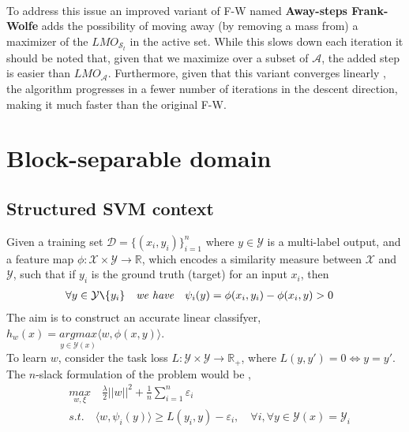 \documentclass{article}
\begin{document}
\\
To address this issue an improved variant of F-W named \textbf{Away-steps Frank-Wolfe} \cite{MarcotteGuelat85} adds the possibility of moving away (by removing a mass from) a maximizer of the $LMO_{\mathcal{S}_{t}}$ in the active set. While this slows down each iteration it should be noted that, given that we maximize over a subset of $\mathcal{A}$, the added step is easier than $LMO_{\mathcal{A}}$. Furthermore, given that this variant converges linearly \cite{JaggiLacoste15}, the algorithm progresses in a fewer number of iterations in the descent direction, making it much faster than the original F-W.
\section{Block-separable domain}
\subsection{Structured SVM context}
Given a training set $\mathcal{D}=\{(x_i,y_i)\}_{i=1}^n$ where $y \in \mathcal{Y}$ is a multi-label output, and a feature map $\phi:\mathcal{X}\times\mathcal{Y}\longrightarrow \mathbb{R}$, which encodes a similarity measure between $\mathcal{X}$ and $\mathcal{Y}$, such that if $y_{i}$ is the ground truth (target) for an input $x_{i}$, then
\begin{equation*}
\begin{aligned}
    &\forall y\in\mathcal{Y}\texttt{\symbol{92}}\{y_{i}\}\quad\textit{we have}\quad \psi_{i}(y) = \phi(x_{i},y_{i})- \phi(x_{i},y) > 0
\end{aligned}
\end{equation*}
The aim is to construct an accurate linear classifyer, $h_{w}(x)= \underset{y\in\mathcal{Y}(x)}{\textit{argmax}}\langle w, \phi(x,y)\rangle$.\\
To learn $w$, consider the task loss $L:\mathcal{Y}\times\mathcal{Y}\longrightarrow\mathbb{R}_{+}$, where $L(y,y\prime)= 0 \Longleftrightarrow y= y\prime$.
\\
The $n$-slack formulation of the problem would be \cite{Lacoste12},
\begin{equation*}
\begin{aligned}
    &\underset{w,\xi}{\textit{max}}\quad\frac{\lambda}{2}||w||^{2}+ \frac{1}{n}\sum_{i=1}^{n}\varepsilon_{i}\\
    &\textit{s.t.}\quad \langle w, \psi_{i}(y)\rangle \geq L(y_{i},y)- \varepsilon_{i},\quad\forall i ,\forall y\in\mathcal{Y}(x)=\mathcal{Y}_{i}
\end{aligned}
\end{equation*}
\end{document}
